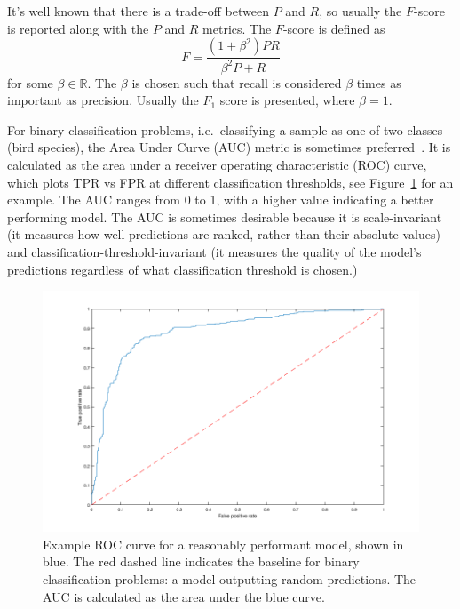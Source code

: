 It's well known that there is a trade-off between $P$ and $R$, so usually the
$F$-score is reported along with the $P$ and $R$ metrics. The $F$-score is
defined as
\begin{equation}
F = \frac{(1+\beta^2)PR}{\beta^2P + R}
\end{equation}
for some $\beta \in \mathbb{R}$. The $\beta$ is chosen such that recall is
considered $\beta$ times as important as precision. Usually the $F_1$ score is
presented, where $\beta = 1$.

For binary classification problems, i.e.\ classifying a sample as one of two
classes (bird species), the Area Under Curve (AUC) metric is sometimes
preferred~\cite{leng2014multi}. It is calculated as the area under a receiver
operating characteristic (ROC) curve, which plots TPR vs FPR at different
classification thresholds, see Figure~\ref{fig:roc} for an example. The AUC
ranges from 0 to 1, with a higher value indicating a better performing model.
The AUC is sometimes desirable because it is scale-invariant (it measures how
well predictions are ranked, rather than their absolute values) and
classification-threshold-invariant (it measures the quality of the model's
predictions regardless of what classification threshold is chosen.)

\begin{figure}[ht]
  \centering
  \includegraphics[width=\textwidth]{figures/roc.png}
  \caption{Example ROC curve for a reasonably performant model, shown in blue.
  The red dashed line indicates the baseline for binary classification problems:
a model outputting random predictions. The AUC is calculated as the area under
the blue curve.}\label{fig:roc}
\end{figure}

